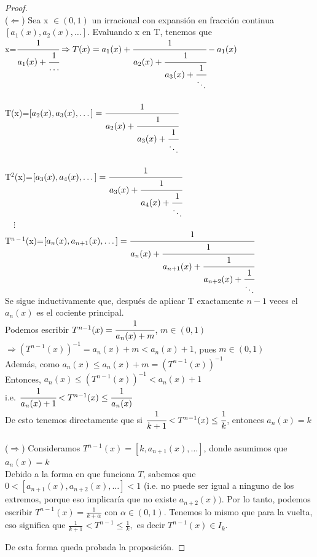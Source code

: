 \documentclass[12pt]{report}
\begin{document}
\begin{proof}\hfill
\\
($\Leftarrow$) Sea x $\in (0,1)$ un irracional con expansión en fracción continua $[a_{1}(x),a_{2}(x),\dots]$. Evaluando x en T, tenemos que \\

x=$\cfrac{1}{a_{1}(x)+\cfrac{1}{\ldots}}\Rightarrow T(x)=a_{1}(x)+\cfrac{1}{a_{2}(x)+\cfrac{1}{a_{3}(x)+\cfrac{1}{\ddots}}} - a_{1}(x)$
\\
\\

T(x)=$\left[a_{2}(x), a_{3}(x), \dots\right]=\cfrac{1}{a_{2}(x)+\cfrac{1}{a_{3}(x)+\cfrac{1}{\ddots}}}$
\\
\\

T$^{2}$(x)=$\left[a_{3}(x), a_{4}(x), \dots\right]=\cfrac{1}{a_{3}(x)+\cfrac{1}{a_{4}(x)+\cfrac{1}{\ddots}}}$
\\

$\quad\vdots$
\\

T$^{n-1}$(x)=$\left[a_{n}(x), a_{n+1}(x), \dots\right]=\cfrac{1}{a_{n}(x)+\cfrac{1}{a_{n+1}(x)+\cfrac{1}{a_{n+2}(x)+\cfrac{1}{\ddots}}}}$
\\

Se sigue inductivamente que, después de aplicar T exactamente $n-1$ veces el $a_{n}(x)$ es el cociente principal. 
\\

Podemos escribir $T^{n-1}(x)=\cfrac{1}{a_{n}(x)+m}$, \quad $m \in (0,1)$
\\

$\Rightarrow (T^{n-1}(x))^{-1}=a_{n}(x)+m< a_{n}(x) +1$, pues $m \in (0,1) $
\\

Además, como $a_{n}(x)\leq a_{n}(x)+m=(T^{n-1}(x))^{-1}$
\\

Entonces, $a_{n}(x)\leq (T^{n-1}(x))^{-1} < a_{n}(x)+1$
\\

i.e. $\cfrac{1}{a_{n}(x)+1}< T^{n-1}(x) \leq \cfrac{1}{a_{n}(x)}$
\\

De esto tenemos directamente que si $\cfrac{1}{k+1}< T^{n-1}(x) \leq \cfrac{1}{k}$, entonces $a_{n}(x)=k$ \\
\\
($\Rightarrow$) Consideramos $T^{n-1}(x) = [k,a_{n+1}(x),\dots]$, donde asumimos que $a_{n}(x) = k$
\\
Debido a la forma en que funciona $T$, sabemos que $0<[a_{n + 1}(x), a_{n + 2}(x), \dots] <1$ (i.e. no puede ser igual a ninguno de los extremos, porque eso implicaría que no existe $a_{n + 2}(x))$. Por lo tanto, podemos escribir $T^{n-1}(x)=\frac{1}{k+\alpha}$ con $\alpha \in (0,1)$. Tenemos lo mismo que para la vuelta, eso significa que $\frac{1}{k+1}< T^{n-1} \leq \frac{1}{k},$ es decir $T^{n-1}(x)\in I_{k}$.

De esta forma queda probada la proposición.
\end{proof}
\end{document}
